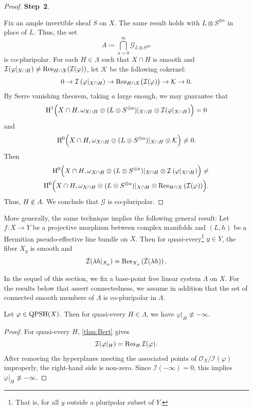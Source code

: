 \begin{proof}
\textbf{Step~2}.

Fix an ample invertible sheaf $S$ on $X$. The same result holds with $L\otimes S^{\otimes a}$ in place of $L$. Thus, the set
\[
A\coloneqq \bigcap_{a=0}^{\infty}\mathcal{G}_{L\otimes S^{\otimes a}}
\]
is co-pluripolar.
For each $H\in \Lambda$ such that $X\cap H$ is smooth and $\mathcal{I}(\varphi|_{X\cap H})\neq \operatorname{Res}_{H\cap X}(\mathcal{I}(\varphi))$, let $\mathcal{K}$ be the following cokernel:
\[
0\rightarrow \mathcal{I}\left(\varphi|_{X\cap H}\right)\rightarrow \operatorname{Res}_{H\cap X}\bigl(\mathcal{I}(\varphi)\bigr)\rightarrow \mathcal{K}\rightarrow 0.
\]
By Serre vanishing theorem, taking $a$ large enough, we may guarantee that
\[
\mathrm{H}^1\Bigl(X\cap H,\omega_{X\cap H}\otimes (L\otimes S^{\otimes a})|_{X\cap H}\otimes \mathcal{I}(\varphi|_{X\cap H})\Bigr)=0
\]
and
\[
\mathrm{H}^0\Bigl(X\cap H,\omega_{X\cap H}\otimes (L\otimes S^{\otimes a})|_{X\cap H}\otimes \mathcal{K}\Bigr)\neq 0.
\]
Then
\[
\begin{split}
\mathrm{H}^0\Bigl(X\cap H,\omega_{X\cap H}\otimes(L\otimes S^{\otimes a})|_{X\cap H}\otimes\mathcal{I}\left(\varphi|_{X\cap H}\right)\Bigr)\neq \\
\mathrm{H}^0\Bigl(X\cap H,\omega_{X\cap H}\otimes(L\otimes S^{\otimes a})|_{X\cap H}\otimes \operatorname{Res}_{H\cap X}\left(\mathcal{I}(\varphi)\right)\Bigr).
\end{split}
\]
Thus, $H\not\in A$. We conclude that $\mathcal{G}$ is co-pluripolar.
\end{proof}


\begin{remark}\label{rmk:generalABT}
    More generally, the same technique implies the following general result: Let $f\colon X\rightarrow Y$ be a projective morphism between complex manifolds and $(L,h)$ be a Hermitian pseudo-effective line bundle on $X$. Then for quasi-every\footnote{That is, for all $y$ outside a pluripolar subset of $Y$.} $y\in Y$, the fiber $X_y$ is smooth and
    \[
    \mathcal{I}(\lambda h|_{X_y})=\operatorname{Res}_{X_y}\left( \mathcal{I}(\lambda h) \right).
    \]
\end{remark}

In the sequel of this section, we fix a base-point free linear system $\Lambda$ on $X$. For the results below that assert connectedness, we assume in addition that the set of connected smooth members of $\Lambda$ is co-pluripolar in $\Lambda$.
\begin{corollary}\label{cor:qpshgeneralres}
    Let $\varphi\in \mathrm{QPSH}(X)$. Then for quasi-every $H\in \Lambda$, we have $\varphi|_H\not\equiv -\infty$.
\end{corollary}
\begin{proof}
    For quasi-every $H$, \cref{thm:Bert} gives
    \[
        \mathcal I(\varphi|_H)=\operatorname{Res}_H\mathcal I(\varphi).
    \]
    After removing the hyperplanes meeting the associated points of $\mathcal O_X/\mathcal I(\varphi)$ improperly, the right-hand side is non-zero. Since $\mathcal I(-\infty)=0$, this implies $\varphi|_H\not\equiv-\infty$.
\end{proof}

